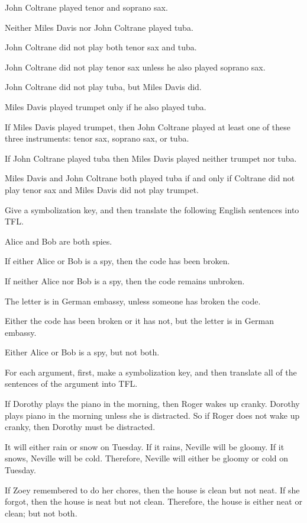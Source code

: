 \begin{earg}
\item John Coltrane played tenor and soprano sax. 
\item Neither Miles Davis nor John Coltrane played tuba. 
\item John Coltrane did not play both tenor sax and tuba. 
\item John Coltrane did not play tenor sax unless he also played soprano sax. 
\item John Coltrane did not play tuba, but Miles Davis did. 
\item Miles Davis played trumpet only if he also played tuba. 
\item If Miles Davis played trumpet, then John Coltrane played at least one of these three instruments: tenor sax, soprano sax, or tuba. 
\item If John Coltrane played tuba then Miles Davis played neither trumpet nor tuba. 
\item Miles Davis and John Coltrane both played tuba if and only if Coltrane did not play tenor sax and Miles Davis did not play trumpet. 
\end{earg}


\problempart
\label{pr.spies}
Give a symbolization key, and then translate the following English sentences into TFL.
\begin{earg}
\item Alice and Bob are both spies.
\item If either Alice or Bob is a spy, then the code has been broken.
\item If neither Alice nor Bob is a spy, then the code remains unbroken.
\item The letter is in German embassy, unless someone has broken the code.
\item Either the code has been broken or it has not, but the letter is in German embassy.
\item Either Alice or Bob is a spy, but not both.
\end{earg}


\problempart
For each argument, first, make a symbolization key, and then translate all of the sentences of the argument into TFL.
\begin{earg}
\item If Dorothy plays the piano in the morning, then Roger wakes up cranky. Dorothy plays piano in the morning unless she is distracted. So if Roger does not wake up cranky, then Dorothy must be distracted.
\item It will either rain or snow on Tuesday. If it rains, Neville will be gloomy. If it snows, Neville will be cold. Therefore, Neville will either be gloomy or cold on Tuesday.
\item If Zoey remembered to do her chores, then the house is clean but not neat. If she forgot, then the house is neat but not clean. Therefore, the house is either neat or clean; but not both.
\end{earg}


